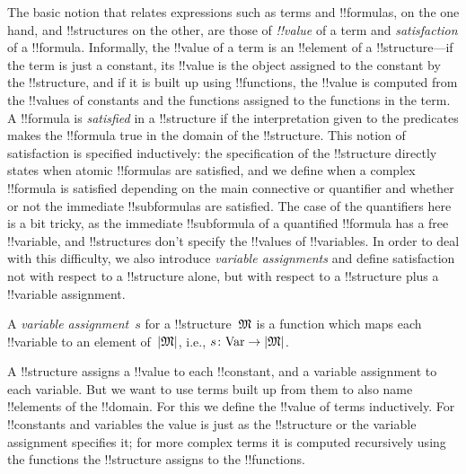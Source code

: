 \documentclass[../../../include/open-logic-section]{subfiles}
\begin{document}


\begin{explain}
The basic notion that relates expressions such as terms and
!!{formula}s, on the one hand, and !!{structure}s on the other, are
those of \emph{!!{value}} of a term and \emph{satisfaction} of a
!!{formula}.  Informally, the !!{value} of a term is an !!{element} of
a !!{structure}---if the term is just a constant, its !!{value} is the
object assigned to the constant by the !!{structure}, and if it is
built up using !!{function}s, the !!{value} is computed from the
!!{value}s of constants and the functions assigned to the functions in
the term.  A !!{formula} is \emph{satisfied} in a !!{structure} if the
interpretation given to the predicates makes the !!{formula} true in
the domain of the !!{structure}. This notion of satisfaction is
specified inductively: the specification of the !!{structure} directly
states when atomic !!{formula}s are satisfied, and we define when a
complex !!{formula} is satisfied depending on the main connective or
quantifier and whether or not the immediate !!{subformula}s are
satisfied. The case of the quantifiers here is a bit tricky, as the
immediate !!{subformula} of a quantified !!{formula} has a free
!!{variable}, and !!{structure}s don't specify the !!{value}s of
!!{variable}s.  In order to deal with this difficulty, we also
introduce \emph{variable assignments} and define satisfaction not with
respect to a !!{structure} alone, but with respect to a !!{structure}
plus a !!{variable} assignment.
\end{explain}

\begin{defn}
A \emph{variable assignment}~$s$ for a !!{structure}~$\mathfrak M$ is a
function which maps each !!{variable} to an element of~$\left| \mathfrak M \right|$,
i.e., $s\colon \mathrm{Var} \to \left| \mathfrak M \right|$.
\end{defn}

\begin{explain}
A !!{structure} assigns a !!{value} to each !!{constant}, and a
variable assignment to each variable.  But we want to use terms built
up from them to also name !!{element}s of the !!{domain}.  For this we
define the !!{value} of terms inductively. For !!{constant}s and
variables the value is just as the !!{structure} or the variable
assignment specifies it; for more complex terms it is computed
recursively using the functions the !!{structure} assigns to the
!!{function}s.
\end{explain}
\end{document}
